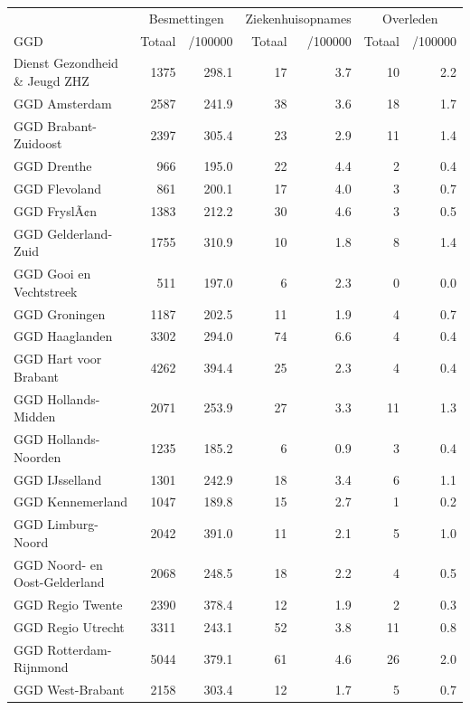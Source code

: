 \documentclass[
  english,
  man,floatsintext]{apa6}
\begin{document}
\begin{table}
\centering\begingroup\fontsize{10}{12}\selectfont

\begin{threeparttable}
\begin{tabular}{lrrrrrr}
\toprule
\multicolumn{1}{c}{ } & \multicolumn{2}{c}{Besmettingen} & \multicolumn{2}{c}{Ziekenhuisopnames} & \multicolumn{2}{c}{Overleden} \\
\cmidrule(l{3pt}r{3pt}){2-3} \cmidrule(l{3pt}r{3pt}){4-5} \cmidrule(l{3pt}r{3pt}){6-7}
GGD & Totaal & /100000 & Totaal & /100000 & Totaal & /100000\\
\midrule
Dienst Gezondheid \& Jeugd ZHZ & 1375 & 298.1 & 17 & 3.7 & 10 & 2.2\\
GGD Amsterdam & 2587 & 241.9 & 38 & 3.6 & 18 & 1.7\\
GGD Brabant-Zuidoost & 2397 & 305.4 & 23 & 2.9 & 11 & 1.4\\
GGD Drenthe & 966 & 195.0 & 22 & 4.4 & 2 & 0.4\\
GGD Flevoland & 861 & 200.1 & 17 & 4.0 & 3 & 0.7\\
GGD FryslÃ¢n & 1383 & 212.2 & 30 & 4.6 & 3 & 0.5\\
GGD Gelderland-Zuid & 1755 & 310.9 & 10 & 1.8 & 8 & 1.4\\
GGD Gooi en Vechtstreek & 511 & 197.0 & 6 & 2.3 & 0 & 0.0\\
GGD Groningen & 1187 & 202.5 & 11 & 1.9 & 4 & 0.7\\
GGD Haaglanden & 3302 & 294.0 & 74 & 6.6 & 4 & 0.4\\
GGD Hart voor Brabant & 4262 & 394.4 & 25 & 2.3 & 4 & 0.4\\
GGD Hollands-Midden & 2071 & 253.9 & 27 & 3.3 & 11 & 1.3\\
GGD Hollands-Noorden & 1235 & 185.2 & 6 & 0.9 & 3 & 0.4\\
GGD IJsselland & 1301 & 242.9 & 18 & 3.4 & 6 & 1.1\\
GGD Kennemerland & 1047 & 189.8 & 15 & 2.7 & 1 & 0.2\\
GGD Limburg-Noord & 2042 & 391.0 & 11 & 2.1 & 5 & 1.0\\
GGD Noord- en Oost-Gelderland & 2068 & 248.5 & 18 & 2.2 & 4 & 0.5\\
GGD Regio Twente & 2390 & 378.4 & 12 & 1.9 & 2 & 0.3\\
GGD Regio Utrecht & 3311 & 243.1 & 52 & 3.8 & 11 & 0.8\\
GGD Rotterdam-Rijnmond & 5044 & 379.1 & 61 & 4.6 & 26 & 2.0\\
GGD West-Brabant & 2158 & 303.4 & 12 & 1.7 & 5 & 0.7\\

\end{tabular}
\end{threeparttable}
\end{table}
\end{document}
